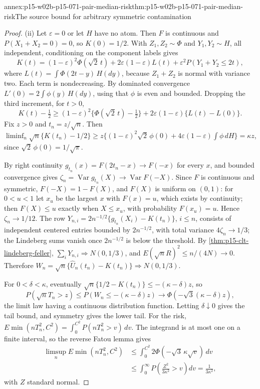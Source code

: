 \begin{annexitem}{annex:p15-w02b-p15-071-pair-median-risk}{thm:p15-w02b-p15-071-pair-median-risk}{The source bound for arbitrary symmetric contamination}
\begin{proof}
(ii) Let \(\varepsilon=0\) or let \(H\) have no atom. Then \(F\) is continuous and
\(P(X_1+X_2=0)=0\), so \(K(0)=1/2\). With \(Z_1,Z_2\sim\Phi\) and
\(Y_1,Y_2\sim H\), all independent, conditioning on the component labels
gives
\[
 K(t)=(1-\varepsilon)^2\Phi(\sqrt2\,t)
      +2\varepsilon(1-\varepsilon)L(t)
      +\varepsilon^2P(Y_1+Y_2\leq2t),
\]
where \(L(t)=\int\Phi(2t-y)\,H(dy)\),
because \(Z_1+Z_2\) is normal with variance two. Each term is
nondecreasing. By dominated convergence \(L'(0)=2\int\phi(y)\,H(dy)\),
using that \(\phi\) is even and bounded. Dropping the third increment,
for \(t>0\),
\[
 K(t)-\tfrac12\geq(1-\varepsilon)^2\{\Phi(\sqrt2\,t)-\tfrac12\}
 +2\varepsilon(1-\varepsilon)\{L(t)-L(0)\}.
\]
Fix \(z>0\) and \(t_n=z/\sqrt n\). Then
\(\liminf_n\sqrt n\{K(t_n)-1/2\}\geq
z\{(1-\varepsilon)^2\sqrt2\,\phi(0)+4\varepsilon(1-\varepsilon)\int\phi\,dH\}
=\kappa z\), since \(\sqrt2\,\phi(0)=1/\sqrt\pi\).

By right continuity \(g_{t_n}(x)=F(2t_n-x)\to F(-x)\) for every \(x\),
and bounded convergence gives
\(\zeta_n=\operatorname{Var}g_{t_n}(X)\to\operatorname{Var}F(-X)\).
Since \(F\) is continuous and symmetric, \(F(-X)=1-F(X)\), and
\(F(X)\) is uniform on \((0,1)\): for \(0<u<1\) let \(x_u\) be the
largest \(x\) with \(F(x)=u\), which exists by continuity; then
\(F(X)\leq u\) exactly when \(X\leq x_u\), with probability
\(F(x_u)=u\). Hence \(\zeta_n\to1/12\).
The row \(Y_{n,i}=2n^{-1/2}\{g_{t_n}(X_i)-K(t_n)\}\), \(i\leq n\),
consists of independent centered entries bounded by \(2n^{-1/2}\), with
total variance \(4\zeta_n\to1/3\); the Lindeberg sums vanish once
\(2n^{-1/2}\) is below the threshold. By
\cref{thm:p15-clt-lindeberg-feller}, \(\sum_iY_{n,i}\Rightarrow N(0,1/3)\),
and \(E(\sqrt nR)^2\leq n/(4N)\to0\). Therefore
\(W_n=\sqrt n\{\widehat U_n(t_n)-K(t_n)\}\Rightarrow N(0,1/3)\).

For \(0<\delta<\kappa\), eventually
\(\sqrt n\{1/2-K(t_n)\}\leq-(\kappa-\delta)z\), so
\[
 P(\sqrt nT_n>z)\leq P(W_n\leq-(\kappa-\delta)z)
 \longrightarrow\Phi(-\sqrt3(\kappa-\delta)z),
\]
the limit law having a continuous distribution function. Letting
\(\delta\downarrow0\) gives the tail bound, and symmetry gives the
lower tail.
For the risk, \(E\min(nT_n^2,C^2)=\int_0^{C^2}P(nT_n^2>v)\,dv\).
The integrand is at most one on a finite interval, so the reverse Fatou
lemma gives
\[
 \begin{split}
 \limsup_nE\min(nT_n^2,C^2)&\leq\int_0^{C^2}2\Phi(-\sqrt3\,\kappa\sqrt v)\,dv\\
 &\leq\int_0^\infty P\!\left(\frac{Z^2}{3\kappa^2}>v\right)dv
 =\frac1{3\kappa^2},
 \end{split}
\]
with \(Z\) standard normal.


\end{proof}
\end{annexitem}
